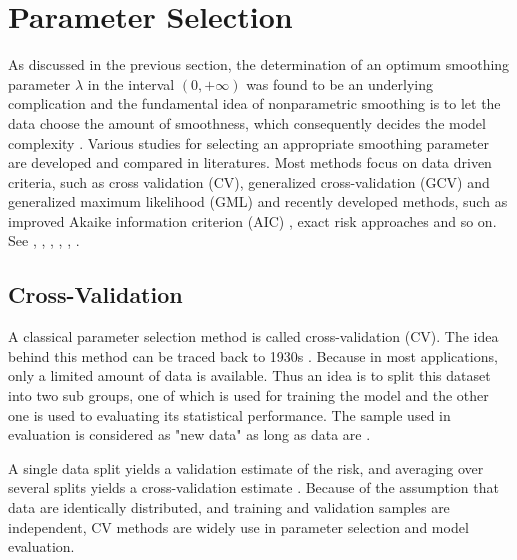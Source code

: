 \section{Parameter Selection}

As discussed in the previous section, the determination of an optimum smoothing parameter $\lambda$ in the interval $(0,+\infty)$ was found to be an underlying complication and the fundamental idea of nonparametric smoothing is to let the data choose the amount of smoothness, which consequently decides the model complexity \cite{gu1998model}. Various studies for selecting an appropriate smoothing parameter are developed and compared in literatures. Most methods focus on data driven criteria, such as cross validation (CV), generalized cross-validation (GCV) \cite{craven1978smoothing} and generalized maximum likelihood (GML) \cite{wahba1985comparison} and recently developed methods, such as improved Akaike information criterion (AIC) \cite{hurvich1998smoothing}, exact risk approaches \cite{wand1997exact} and so on. See \eg \cite{craven1978smoothing}, \cite{hardle1988far}, \cite{hardle1990applied}, \cite{wahba1990spline},  \cite{green1993nonparametric}, \cite{cantoni2001resistant} \cite{aydin2013smoothing}.  


\subsection*{Cross-Validation}


A classical parameter selection method is called cross-validation (CV). The idea behind this method can be traced back to 1930s \cite{larson1931shrinkage}. Because in most applications, only a limited amount of data is available. Thus an idea is to split this dataset into two sub groups, one of which is used for training the model and the other one is used to evaluating its statistical performance. The sample used in evaluation is considered as "new data" as long as data are \iid. 

A single data split yields a validation estimate of the risk, and averaging over several splits yields a cross-validation estimate \cite{arlot2010survey}. Because of the assumption that data are identically distributed, and training and validation samples are independent, CV methods are widely use in parameter selection and model evaluation. 



